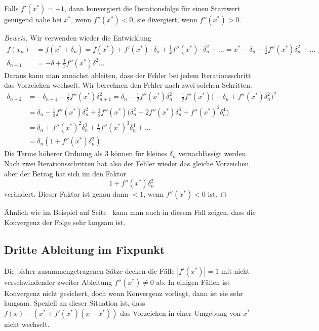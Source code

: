 \begin{satz}
Falls $f'(x^*)=-1$, dann konvergiert die Iterationsfolge für einen
Startwert genügend nahe bei $x^*$, wenn $f''(x^*) <0$, sie divergiert,
wenn $f''(x^*)>0$.
\end{satz}

\begin{proof}[Beweis]
Wir verwenden wieder die Entwicklung
\begin{align*}
f(x_n)
&=
f(x^* +\delta_n)
=
f(x^*) + f'(x^*) \cdot \delta_n + \frac12 f''(x^*)\cdot \delta_n^2
+ \dots
=
x^* - \delta_n + \frac12f''(x^*)\delta_n^2 +\dots
\\
\delta_{n+1}
&=
-\delta + \frac12f''(x^*)\delta^2 \dots
\end{align*}
Daraus kann man zunächst ableiten, dass der Fehler bei jedem 
Iterationsschritt das Vorzeichen wechselt.
Wir berechnen den Fehler nach zwei solchen Schritten.
\begin{align*}
\delta_{n+2}
&=
-\delta_{n+1} + \frac12f''(x^*) \delta_{n+1}^2
=
\delta_n - \frac12f''(x^*) \delta_n^2
+
\frac12 f''(x^*) \bigl(-\delta_n + f''(x^*)\delta_n^2\bigr)^2
\\
&=
\delta_n 
-\frac12 f''(x^*)
\delta_n^2
+\frac12 f''(x^*)
\bigl( \delta_n^2 + 2f''(x^*)\delta_n^3 + f''(x^*)^2\delta_n^4\bigr)
\\
&=
\delta_n
+
f''(x^*)^2\delta_n^3
+
\frac12f''(x^*)^3\delta_n^4
+\dots
\\
&=
\delta_n (1 + f''(x^*)\delta_n^2)
\end{align*}
Die Terme höherer Ordnung als $3$ können für kleines $\delta_n$ 
vernachlässigt werden.
Nach zwei Iterationsschritten hat also der Fehler wieder das gleiche
Vorzeichen, aber der Betrag hat sich im den Faktor
\[
1+f''(x^*)\delta_n^2
\]
verändert.
Dieser Faktor ist genau dann $<1$, wenn $f''(x^*)<0$ ist.
\end{proof}

Ähnlich wie im Beispiel auf 
Seite~\pageref{buch:beispiel:logistisch3} kann man auch in diesem
Fall zeigen, dass die Konvergenz der Folge sehr langsam ist.

%
%
\subsection{Dritte Ableitung im Fixpunkt
\label{buch:subsection:dritteableitungfixpunkt}}
Die bisher zusammengetragenen Sätze decken die Fälle $|f'(x^*)|=1$ mit
nicht verschwindender zweiter Ableitung $f''(x^*)\ne 0$ ab.
In einigen Fällen ist Konvergenz nicht gesichert, doch wenn Konvergenz
vorliegt, dann ist sie sehr langsam.
Speziell an dieser Situation ist, dass
$f(x)-(x^* + f'(x^*)(x-x^*))$
das Vorzeichen in einer Umgebung von $x^*$ nicht wechselt.

